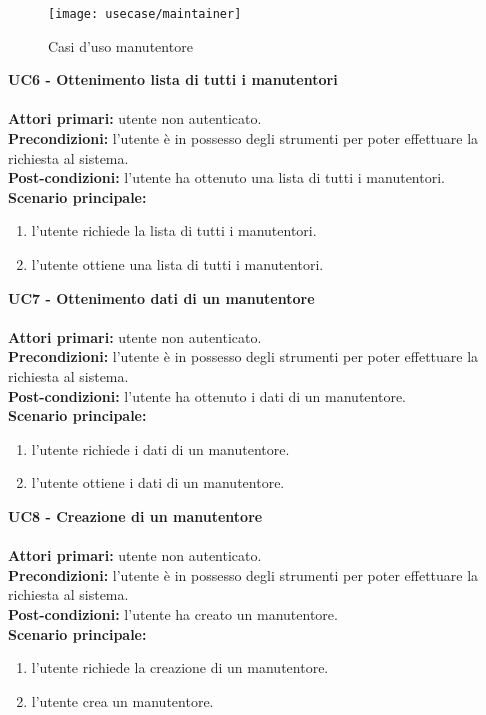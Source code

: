 \begin{figure}[H]
    \centering
    \texttt{[image: usecase/maintainer]}
    \caption{Casi d'uso manutentore}
\end{figure}
\textbf{UC6 - Ottenimento lista di tutti i manutentori}
\\\\
\textbf{Attori primari:} utente non autenticato.
\\
\textbf{Precondizioni:} l'utente è in possesso degli strumenti per poter effettuare la richiesta al sistema.
\\
\textbf{Post-condizioni:} l'utente ha ottenuto una lista di tutti i manutentori.
\\
\textbf{Scenario principale:}
\begin{enumerate}
    \item l'utente richiede la lista di tutti i manutentori.
    \item l'utente ottiene una lista di tutti i manutentori.
\end{enumerate}
\leavevmode\newline
\textbf{UC7 - Ottenimento dati di un manutentore}
\\\\
\textbf{Attori primari:} utente non autenticato.
\\
\textbf{Precondizioni:} l'utente è in possesso degli strumenti per poter effettuare la richiesta al sistema.
\\
\textbf{Post-condizioni:} l'utente ha ottenuto i dati di un manutentore.
\\
\textbf{Scenario principale:}
\begin{enumerate}
    \item l'utente richiede i dati di un manutentore.
    \item l'utente ottiene i dati di un manutentore.
\end{enumerate}
\leavevmode\newline
\textbf{UC8 - Creazione di un manutentore}
\\\\
\textbf{Attori primari:} utente non autenticato.
\\
\textbf{Precondizioni:} l'utente è in possesso degli strumenti per poter effettuare la richiesta al sistema.
\\
\textbf{Post-condizioni:} l'utente ha creato un manutentore.
\\
\textbf{Scenario principale:}
\begin{enumerate}
    \item l'utente richiede la creazione di un manutentore.
    \item l'utente crea un manutentore.
\end{enumerate}

